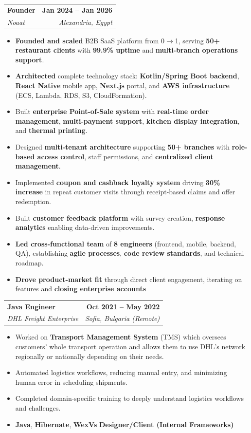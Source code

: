 \documentclass[letterpaper,11pt]{article}
\makeatletter
\newcommand{\resumeItem}[1]{
  \item\small{
    {#1 \vspace{-2pt}}
  }
}
\newcommand{\resumeSubheading}[4]{
  \vspace{-2pt}\item
    \begin{tabular*}{1.0\textwidth}[t]{l@{\extracolsep{\fill}}r}
      \textbf{#1} & \textbf{\small #2} \\
      \textit{\small#3} & \textit{\small #4} \\
    \end{tabular*}\vspace{-7pt}
}
\newcommand{\resumeItemListStart}{\begin{itemize}}
\newcommand{\resumeItemListEnd}{\end{itemize}\vspace{-5pt}}
\makeatother
\begin{document}
\resumeSubheading
  {Founder}{Jan 2024 -- Jan 2026}
  {Noaat}{Alexandria, Egypt}
\resumeItemListStart
\resumeItem{\textbf{Founded and scaled} B2B SaaS platform from 0$\rightarrow$1, serving \textbf{50+ restaurant clients} with \textbf{99.9\% uptime} and \textbf{multi-branch operations support}.}
\resumeItem{\textbf{Architected} complete technology stack: \textbf{Kotlin/Spring Boot backend}, \textbf{React Native} mobile app, \textbf{Next.js} portal, and \textbf{AWS infrastructure} (ECS, Lambda, RDS, S3, CloudFormation).}
\resumeItem{Built \textbf{enterprise Point-of-Sale system} with \textbf{real-time order management}, \textbf{multi-payment support}, \textbf{kitchen display integration}, and \textbf{thermal printing}.}
\resumeItem{Designed \textbf{multi-tenant architecture} supporting \textbf{50+ branches} with \textbf{role-based access control}, staff permissions, and \textbf{centralized client management}.}
\resumeItem{Implemented \textbf{coupon and cashback loyalty system} driving \textbf{30\% increase} in repeat customer visits through receipt-based claims and offer redemption.}
\resumeItem{Built \textbf{customer feedback platform} with survey creation, \textbf{response analytics} enabling data-driven improvements.}
\resumeItem{\textbf{Led cross-functional team} of \textbf{8 engineers} (frontend, mobile, backend, QA), establishing \textbf{agile processes}, \textbf{code review standards}, and technical roadmap.}
\resumeItem{\textbf{Drove product-market fit} through direct client engagement, iterating on features and \textbf{closing enterprise accounts}}
\resumeItemListEnd


    \resumeSubheading
      {Java Engineer}{Oct 2021 -- May 2022}
      {DHL Freight Enterprise}{Sofia, Bulgaria (Remote)}
      \resumeItemListStart
        \resumeItem{Worked on \textbf{Transport Management System} (TMS) which oversees customers’ whole transport operation and allows them to use DHL’s network regionally or nationally depending on their needs.}
              \resumeItem{Automated logistics workflows, reducing manual entry, and minimizing human error in scheduling shipments.}
      \resumeItem{Completed domain-specific training to deeply understand logistics workflows and challenges.}
        \resumeItem{\textbf{Java}, \textbf{Hibernate}, \textbf{WexVs} \textbf{Designer/Client (Internal Frameworks)}}
    \resumeItemListEnd
\end{document}

